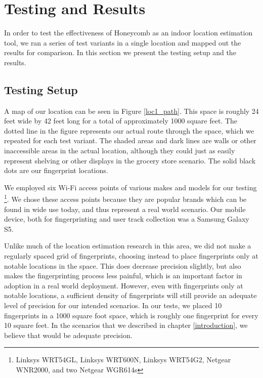 \chapter{Testing and Results}
\label{results}
%

In order to test the effectiveness of Honeycomb as an indoor location estimation tool, we ran a series of test variants in a single location and mapped out the results for comparison. In this section we present the testing setup and the results. 


\section{Testing Setup}
%

 A map of our location can be seen in Figure \ref{loc1_path}. This space is roughly 24 feet wide by 42 feet long for a total of approximately 1000 square feet. The dotted line in the figure represents our actual route through the space, which we repeated for each test variant. The shaded areas and dark lines are walls or other inaccessible areas in the actual location, although they could just as easily represent shelving or other displays in the grocery store scenario. The solid black dots are our fingerprint locations.
 
 We employed six Wi-Fi access points of various makes and models for our testing \footnote{Linksys WRT54GL, Linksys WRT600N, Linksys WRT54G2, Netgear WNR2000, and two Netgear WGR614s}. We chose these access points because they are popular brands which can be found in wide use today, and thus represent a real world scenario. Our mobile device, both for fingerprinting and user track collection was a Samsung Galaxy S5. 
 
 Unlike much of the location estimation research in this area, we did not make a regularly spaced grid of fingerprints, choosing instead to place fingerprints only at notable locations in the space. This does decrease precision slightly, but also makes the fingerprinting process less painful, which is an important factor in adoption in a real world deployment. However, even with fingerprints only at notable locations, a sufficient density of fingerprints will still provide an adequate level of precision for our intended scenarios. In our tests, we placed 10 fingerprints in a 1000 square foot space, which is roughly one fingerprint for every 10 square feet. In the scenarios that we described in chapter \ref{introduction}, we believe that would be adequate precision. 



